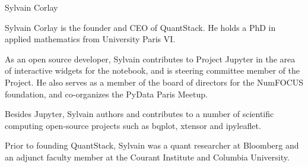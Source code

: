 \begin{participant}[type=leadPI,PM=6,gender=male]{Sylvain Corlay}

  \par Sylvain Corlay is the founder and CEO of QuantStack. He holds a PhD in applied mathematics from University Paris VI.

  \par As an open source developer, Sylvain contributes to Project Jupyter in the area of interactive widgets for the notebook, and is steering committee member of the Project. He also serves as a member of the board of directors for the NumFOCUS foundation, and co-organizes the PyData Paris Meetup.

  \par Besides Jupyter, Sylvain authors and contributes to a number of scientific computing open-source projects such as bqplot, xtensor and ipyleaflet.

  \par Prior to founding QuantStack, Sylvain was a quant researcher at Bloomberg and an adjunct faculty member at the Courant Institute and Columbia University.
\end{participant}

